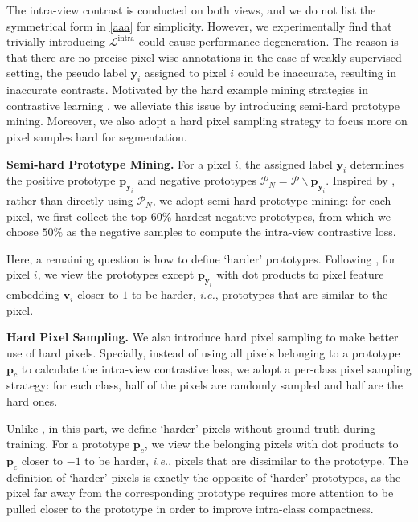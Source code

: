 \documentclass[10pt,twocolumn,letterpaper]{article}
\begin{document}
The intra-view contrast is conducted on both views, and we do not list the symmetrical form in \cref{aaa} for simplicity.
However, we experimentally find that trivially introducing $\mathcal{L}^{\text{intra}}$ could cause performance degeneration. 
The reason is that there are no precise pixel-wise annotations in the case of weakly supervised setting, the pseudo label $\boldsymbol{y}_{i}$ assigned to pixel $i$ could be inaccurate, resulting in inaccurate contrasts.
Motivated by the hard example mining strategies in contrastive learning \cite{CLwith_hard_negatives, wang2021exploring_fully_supervised}, we alleviate this issue by introducing semi-hard prototype mining.
Moreover, we also adopt a hard pixel sampling strategy to focus more on pixel samples hard for segmentation.


\textbf{Semi-hard Prototype Mining.} For a pixel $i$, the assigned label $\boldsymbol{y}_{i}$ determines the positive prototype $\boldsymbol{p}_{\boldsymbol{y}_{i}}$ and negative prototypes $\mathcal{P}_N = \mathcal{P}\backslash \boldsymbol{p}_{\boldsymbol{y}_{i}}$.
Inspired by \cite{wang2021exploring_fully_supervised}, rather than directly using $\mathcal{P}_N$, we adopt semi-hard prototype mining: for each pixel, we first collect the top $60\%$ hardest negative prototypes, from which we choose $50\%$ as the negative samples to compute the intra-view contrastive loss.


Here, a remaining question is how to define `harder' prototypes. Following \cite{wang2021exploring_fully_supervised}, for pixel $i$, we view the prototypes except $\boldsymbol{p}_{\boldsymbol{y}_{i}}$ with dot products to pixel feature embedding $\boldsymbol{v}_{i}$ closer to $1$ to be harder, \textit{i.e.}, prototypes that are similar to the pixel. 




\textbf{Hard Pixel Sampling.} We also introduce hard pixel sampling to make better use of hard pixels.
Specially, instead of using all pixels belonging to a prototype $\boldsymbol{p}_{c}$ to calculate the intra-view contrastive loss, we adopt a per-class pixel sampling strategy: for each class, half of the pixels are randomly sampled and half are the hard ones.


Unlike \cite{wang2021exploring_fully_supervised}, in this part, we define `harder' pixels without ground truth during training.
For a prototype $\boldsymbol{p}_c$, we view the belonging pixels with dot products to $\boldsymbol{p}_c$ closer to $-1$ to be harder, \textit{i.e.}, pixels that are dissimilar to the prototype.
The definition of `harder' pixels is exactly the opposite of `harder' prototypes, as the pixel far away from the corresponding prototype requires more attention to be pulled closer to the prototype in order to improve intra-class compactness.
\end{document}
